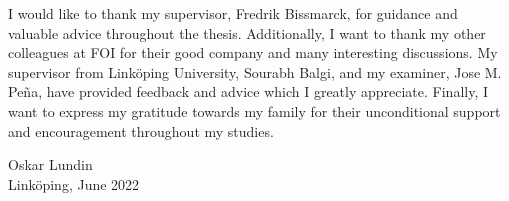 
I would like to thank my supervisor, Fredrik Bissmarck, for guidance and valuable advice throughout the thesis.
Additionally, I want to thank my other colleagues at FOI for their good company and many interesting discussions.
My supervisor from Linköping University, Sourabh Balgi, and my examiner, Jose M. Peña, have provided feedback and advice which I greatly appreciate. 
Finally, I want to express my gratitude towards my family for their unconditional support and encouragement throughout my studies.

\begin{flushright}
    Oskar Lundin\\
    Linköping, June 2022
\end{flushright}
